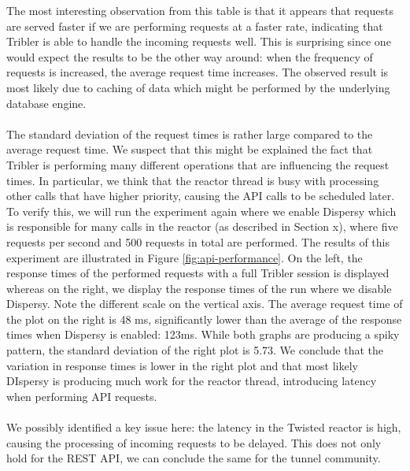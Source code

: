 The most interesting observation from this table is that it appears that requests are served faster if we are performing requests at a faster rate, indicating that Tribler is able to handle the incoming requests well. This is surprising since one would expect the results to be the other way around: when the frequency of requests is increased, the average request time increases. The observed result is most likely due to caching of data which might be performed by the underlying database engine.\\\\
The standard deviation of the request times is rather large compared to the average request time. We suspect that this might be explained the fact that Tribler is performing many different operations that are influencing the request times. In particular, we think that the reactor thread is busy with processing other calls that have higher priority, causing the API calls to be scheduled later. To verify this, we will run the experiment again where we enable Dispersy which is responsible for many calls in the reactor (as described in Section x), where five requests per second and 500 requests in total are performed. The results of this experiment are illustrated in Figure \ref{fig:api-performance}. On the left, the response times of the performed requests with a full Tribler session is displayed whereas on the right, we display the response times of the run where we disable Dispersy. Note the different scale on the vertical axis. The average request time of the plot on the right is 48 ms, significantly lower than the average of the response times when Dispersy is enabled: 123ms. While both graphs are producing a spiky pattern, the standard deviation of the right plot is 5.73. We conclude that the variation in response times is lower in the right plot and that most likely DIspersy is producing much work for the reactor thread, introducing latency when performing API requests.\\\\
We possibly identified a key issue here: the latency in the Twisted reactor is high, causing the processing of incoming requests to be delayed. This does not only hold for the REST API, we can conclude the same for the tunnel community.\\\\
